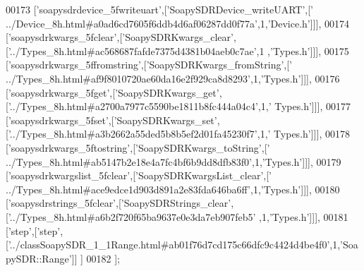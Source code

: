 \begin{DoxyCode}
00173   [\textcolor{stringliteral}{'soapysdrdevice\_5fwriteuart'},[\textcolor{stringliteral}{'SoapySDRDevice\_writeUART'},[\textcolor{stringliteral}{'
      ../Device\_8h.html#a0ad6cd7605f6ddb4d6af06287dd0f77a'},1,\textcolor{stringliteral}{'Device.h'}]]],
00174   [\textcolor{stringliteral}{'soapysdrkwargs\_5fclear'},[\textcolor{stringliteral}{'SoapySDRKwargs\_clear'},[\textcolor{stringliteral}{'../Types\_8h.html#ac568687fafde7375d4381b04aeb0c7ae'},1
      ,\textcolor{stringliteral}{'Types.h'}]]],
00175   [\textcolor{stringliteral}{'soapysdrkwargs\_5ffromstring'},[\textcolor{stringliteral}{'SoapySDRKwargs\_fromString'},[\textcolor{stringliteral}{'
      ../Types\_8h.html#af9f8010720ae60da16e2f929ca8d8293'},1,\textcolor{stringliteral}{'Types.h'}]]],
00176   [\textcolor{stringliteral}{'soapysdrkwargs\_5fget'},[\textcolor{stringliteral}{'SoapySDRKwargs\_get'},[\textcolor{stringliteral}{'../Types\_8h.html#a2700a7977c5590be1811b8fc444a04c4'},1,\textcolor{stringliteral}{'
      Types.h'}]]],
00177   [\textcolor{stringliteral}{'soapysdrkwargs\_5fset'},[\textcolor{stringliteral}{'SoapySDRKwargs\_set'},[\textcolor{stringliteral}{'../Types\_8h.html#a3b2662a55ded5b8b5ef2d01fa45230f7'},1,\textcolor{stringliteral}{'
      Types.h'}]]],
00178   [\textcolor{stringliteral}{'soapysdrkwargs\_5ftostring'},[\textcolor{stringliteral}{'SoapySDRKwargs\_toString'},[\textcolor{stringliteral}{'
      ../Types\_8h.html#ab5147b2e18e4a7fc4bf6b9dd8dfb83f0'},1,\textcolor{stringliteral}{'Types.h'}]]],
00179   [\textcolor{stringliteral}{'soapysdrkwargslist\_5fclear'},[\textcolor{stringliteral}{'SoapySDRKwargsList\_clear'},[\textcolor{stringliteral}{'
      ../Types\_8h.html#ace9edce1d903d891a2e83fda646ba6ff'},1,\textcolor{stringliteral}{'Types.h'}]]],
00180   [\textcolor{stringliteral}{'soapysdrstrings\_5fclear'},[\textcolor{stringliteral}{'SoapySDRStrings\_clear'},[\textcolor{stringliteral}{'../Types\_8h.html#a6b2f720f65ba9637e0e3da7eb907feb5'}
      ,1,\textcolor{stringliteral}{'Types.h'}]]],
00181   [\textcolor{stringliteral}{'step'},[\textcolor{stringliteral}{'step'},[\textcolor{stringliteral}{'../classSoapySDR\_1\_1Range.html#ab01f76d7cd175c66dfc9c4424d4be4f0'},1,\textcolor{stringliteral}{'SoapySDR::Range'}]]
      ]
00182 ];
\end{DoxyCode}
